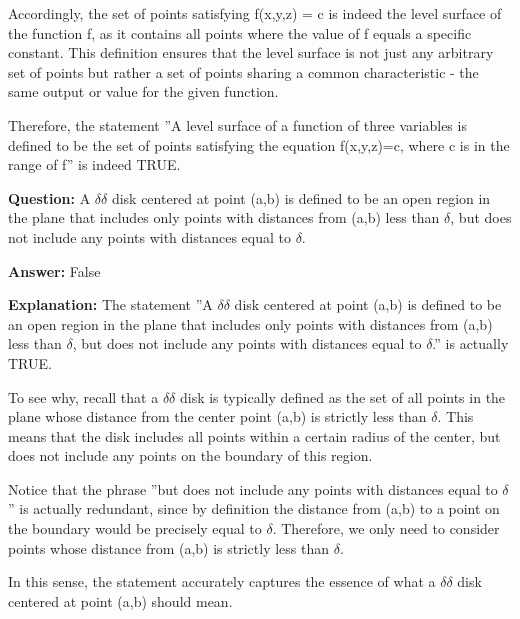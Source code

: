 \documentclass{article}
\begin{document}
Accordingly, the set of points satisfying f(x,y,z) = c is indeed the level surface of the function f, as it contains all points where the value of f equals a specific constant. This definition ensures that the level surface is not just any arbitrary set of points but rather a set of points sharing a common characteristic - the same output or value for the given function.

Therefore, the statement ''A level surface of a function of three variables is defined to be the set of points satisfying the equation f(x,y,z)=c, where c is in the range of f'' is indeed TRUE.
                
                \vspace{0.5cm} 
        
            
                \textbf {Question:} A \ensuremath{\delta}\ensuremath{\delta} disk centered at point (a,b) is defined to be an open region in the plane that includes only points with distances from (a,b) less than \ensuremath{\delta}, but does not include any points with distances equal to \ensuremath{\delta}.
                
                \textbf{Answer:} False

                \textbf{Explanation:} The statement ''A \ensuremath{\delta}\ensuremath{\delta} disk centered at point (a,b) is defined to be an open region in the plane that includes only points with distances from (a,b) less than \ensuremath{\delta}, but does not include any points with distances equal to \ensuremath{\delta}.'' is actually TRUE.

To see why, recall that a \ensuremath{\delta}\ensuremath{\delta} disk is typically defined as the set of all points in the plane whose distance from the center point (a,b) is strictly less than \ensuremath{\delta}. This means that the disk includes all points within a certain radius of the center, but does not include any points on the boundary of this region.

Notice that the phrase ''but does not include any points with distances equal to \ensuremath{\delta}'' is actually redundant, since by definition the distance from (a,b) to a point on the boundary would be precisely equal to \ensuremath{\delta}. Therefore, we only need to consider points whose distance from (a,b) is strictly less than \ensuremath{\delta}.

In this sense, the statement accurately captures the essence of what a \ensuremath{\delta}\ensuremath{\delta} disk centered at point (a,b) should mean.
                
\end{document}
